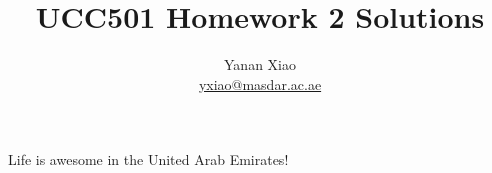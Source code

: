 \documentclass[12pt]{article}
\begin{document}

\title{UCC501 Homework 2 Solutions}
\author{Yanan Xiao\\\url{yxiao@masdar.ac.ae}}
\maketitle{}

Life is awesome in the United Arab Emirates!
\end{document}
